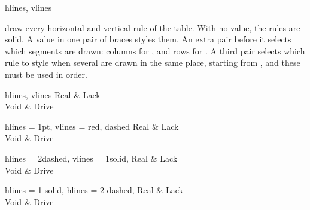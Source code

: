 \begin{codedescribe}[
    key,
    new=2021F
  ]{hlines, vlines}
  \begin{codesyntax}
  \end{codesyntax}
   draw every horizontal and vertical rule of the table. With no value, the rules are solid. A value in one pair of braces styles them. An extra pair before it selects which segments are drawn: columns for , and rows for . A third pair selects which rule to style when several are drawn in the same place, starting from , and these must be used in order.

  \begin{codestore}[st=rules:hlines]
    \begin{tblr}{hlines, vlines}
      Real & Lack  \\
      Void & Drive
    \end{tblr}\quad
    \begin{tblr}{
        hlines = {1pt}, vlines = {red, dashed}
      }
      Real & Lack  \\
      Void & Drive
    \end{tblr}\quad
    \begin{tblr}{
        hlines = {2}{dashed},
        vlines = {1}{solid},
      }
      Real & Lack  \\
      Void & Drive
    \end{tblr}\quad
    \begin{tblr}{
        hlines = {1}{-}{solid},
        hlines = {2}{-}{dashed},
      }
      Real & Lack  \\
      Void & Drive
    \end{tblr}\end{codestore}
  \begin{center}
  \end{center}
\end{codedescribe}

